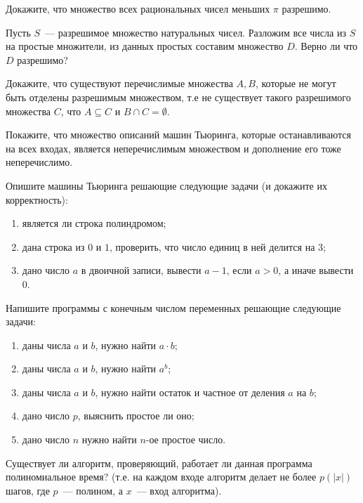 
\begin{task}
    Докажите, что множество всех рациональных чисел меньших $\pi$ разрешимо.
\end{task}

\begin{task}
    Пусть $S$~--- разрешимое множество натуральных чисел. Разложим все числа из $S$ на простые множители, из данных простых
    составим множество $D$. Верно ли что $D$ разрешимо?
\end{task}

\begin{task}
    Докажите, что существуют перечислимые множества $A, B$, которые не могут быть отделены разрешимым множеством, т.е не
	существует такого разрешимого множества $C$, что $A \subseteq C$ и $B \cap C = \emptyset$.
\end{task}


\begin{task}
    Покажите, что множество описаний машин Тьюринга, которые останавливаются на всех входах, является неперечислимым множеством и
    дополнение его тоже неперечислимо.
\end{task}


\begin{task}
	Опишите машины Тьюринга решающие следующие задачи (и докажите их корректность):
	\begin{enumerate}
		\item является ли строка полиндромом;
		\item дана строка из $0$ и $1$, проверить, что число единиц в ней делится на $3$;
		\item дано число $a$ в двоичной записи, вывести $a - 1$, если $a > 0$, а иначе вывести $0$.
	\end{enumerate}
\end{task}

\begin{task}
	Напишите программы с конечным числом переменных решающие следующие задачи:
	\begin{enumerate}
		\item даны числа $a$ и $b$, нужно найти $a \cdot b$;
		\item даны числа $a$ и $b$, нужно найти $a^b$;
		\item даны числа $a$ и $b$, нужно найти остаток и частное от деления $a$ на $b$;
		\item дано число $p$, выяснить простое ли оно;
		\item дано число $n$ нужно найти $n$-ое простое число.
	\end{enumerate}
\end{task}


\breakline

\begin{ptask}{9}
    Существует ли алгоритм, проверяющий, работает ли данная программа полиномиальное время? (т.е. на каждом входе алгоритм делает
    не более $p(|x|)$ шагов, где $p$~--- полином, а $x$~--- вход алгоритма).
\end{ptask}
